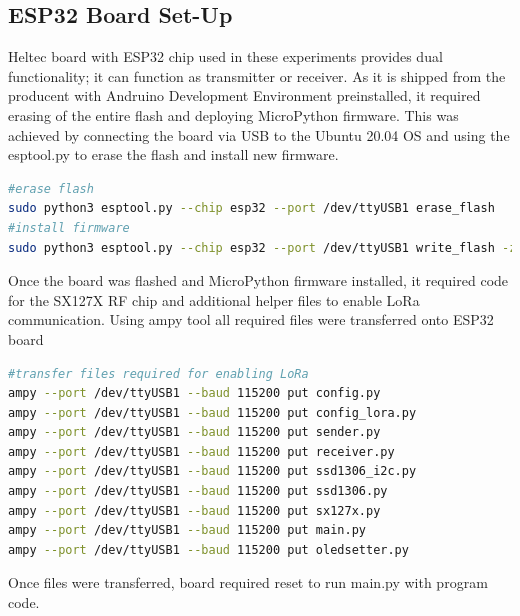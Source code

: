 \documentclass[oneside,12pt]{book}
\begin{document}
\subsection{ESP32 Board Set-Up}
Heltec board with ESP32 chip used in these experiments provides dual functionality; it can function as transmitter or receiver. As it is shipped from the producent with Andruino Development Environment preinstalled, it required erasing of the entire flash and deploying MicroPython firmware. This was achieved by connecting the board via USB to the Ubuntu 20.04 OS and using the esptool.py to erase the flash and install new firmware.
\begin{lstlisting}[language=Bash, caption=Firmware installation on ESP32 board,captionpos=b]
#erase flash
sudo python3 esptool.py --chip esp32 --port /dev/ttyUSB1 erase_flash
#install firmware
sudo python3 esptool.py --chip esp32 --port /dev/ttyUSB1 write_flash -z 0x1000 esp32-20220117-v1.18.bin

\end{lstlisting}
Once the board was flashed and MicroPython firmware installed, it required code for the SX127X RF chip and additional helper files to enable LoRa communication. Using ampy tool all required files were transferred onto ESP32 board 
\begin{lstlisting}[language=Bash, caption=File transfer with Ampy tool,captionpos=b]
#transfer files required for enabling LoRa
ampy --port /dev/ttyUSB1 --baud 115200 put config.py
ampy --port /dev/ttyUSB1 --baud 115200 put config_lora.py
ampy --port /dev/ttyUSB1 --baud 115200 put sender.py
ampy --port /dev/ttyUSB1 --baud 115200 put receiver.py
ampy --port /dev/ttyUSB1 --baud 115200 put ssd1306_i2c.py
ampy --port /dev/ttyUSB1 --baud 115200 put ssd1306.py
ampy --port /dev/ttyUSB1 --baud 115200 put sx127x.py
ampy --port /dev/ttyUSB1 --baud 115200 put main.py
ampy --port /dev/ttyUSB1 --baud 115200 put oledsetter.py
\end{lstlisting}
Once files were transferred, board required reset to run main.py with program code.
\end{document}
